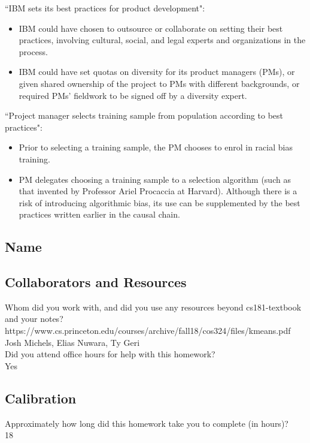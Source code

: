 \documentclass[submit]{harvardml}
\begin{document}
``IBM sets its best practices for product development":
\begin{itemize}
  \item IBM could have chosen to outsource or collaborate on setting their best practices, involving cultural, social, and legal experts and organizations in the process.
  \item IBM could have set quotas on diversity for its product managers (PMs), or given shared ownership of the project to PMs with different backgrounds, or required PMs' fieldwork to be signed off by a diversity expert.
\end{itemize}
``Project manager selects training sample from population according to best practices":
\begin{itemize}
    \item Prior to selecting a training sample, the PM chooses to enrol in racial bias training.
    \item PM delegates choosing a training sample to a selection algorithm (such as that invented by Professor Ariel Procaccia at Harvard). Although there is a risk of introducing algorithmic bias, its use can be supplemented by the best practices written earlier in the causal chain.
\end{itemize}

\newpage
\subsection*{Name}

\subsection*{Collaborators and Resources}
Whom did you work with, and did you use any resources beyond cs181-textbook and your notes?\\
https://www.cs.princeton.edu/courses/archive/fall18/cos324/files/kmeans.pdf\\
Josh Michels, Elias Nuwara, Ty Geri\\

Did you attend office hours for help with this homework?\\
Yes

\subsection*{Calibration}
Approximately how long did this homework take you to complete (in hours)?\\
18
\end{document}
